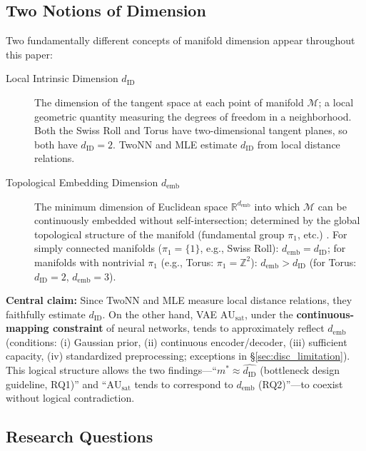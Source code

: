 \documentclass[12pt,a4paper]{article}
\newcommand{\dID}{d_{\mathrm{ID}}}
\newcommand{\dzopt}{m^*}
\newcommand{\R}{\mathbb{R}}
\newcommand{\AUsat}{\mathrm{AU}_{\mathrm{sat}}}
\newcommand{\demb}{d_{\mathrm{emb}}}
\begin{document}
\subsection{Two Notions of Dimension}\label{sec:intro_dim}

Two fundamentally different concepts of manifold dimension appear throughout this paper:

\begin{description}
  \item[Local Intrinsic Dimension $\dID$]
        The dimension of the tangent space at each point of manifold $\mathcal{M}$;
        a local geometric quantity measuring the degrees of freedom in a neighborhood.
        Both the Swiss Roll and Torus have two-dimensional tangent planes, so both have $\dID = 2$.
        TwoNN and MLE estimate $\dID$ from local distance relations.

  \item[Topological Embedding Dimension $\demb$]
        The minimum dimension of Euclidean space $\R^{\demb}$ into which $\mathcal{M}$
        can be continuously embedded without self-intersection;
        determined by the global topological structure of the manifold (fundamental group $\pi_1$, etc.)
        \cite{hatcher2002algebraic,guillemin1974differential}.
        For simply connected manifolds ($\pi_1 = \{1\}$, e.g., Swiss Roll): $\demb = \dID$;
        for manifolds with nontrivial $\pi_1$ (e.g., Torus: $\pi_1 = \mathbb{Z}^2$):
        $\demb > \dID$ (for Torus: $\dID = 2$, $\demb = 3$).
\end{description}

\textbf{Central claim:}
Since TwoNN and MLE measure local distance relations, they faithfully estimate $\dID$.
On the other hand, VAE $\AUsat$, under the \textbf{continuous-mapping constraint} of neural networks,
tends to approximately reflect $\demb$
\cite{hatcher2002algebraic,carlsson2009topology}
(conditions: (i) Gaussian prior, (ii) continuous encoder/decoder,
(iii) sufficient capacity, (iv) standardized preprocessing; exceptions in \S\ref{sec:disc_limitation}).
This logical structure allows the two findings---``$\dzopt \approx \hat{\dID}$ (bottleneck design guideline, RQ1)''
and ``$\AUsat$ tends to correspond to $\demb$ (RQ2)''---to coexist without logical contradiction.

\subsection{Research Questions}\label{sec:intro_rq}
\end{document}
